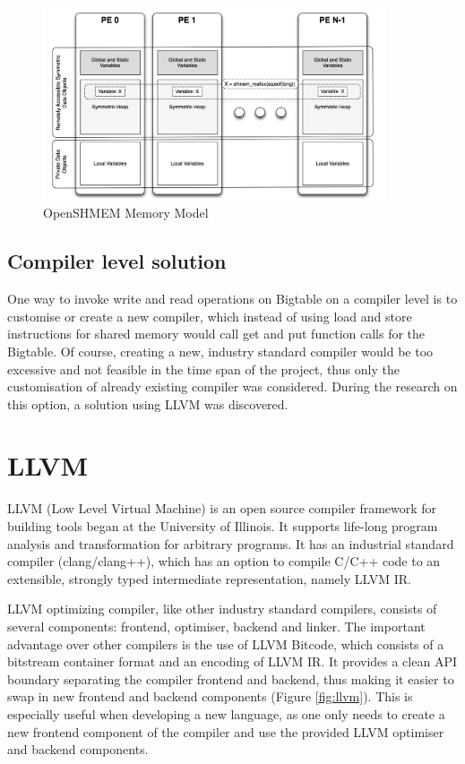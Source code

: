 \documentclass[bsc,frontabs,twoside,singlespacing,parskip,deptreport]{infthesis}     %
\begin{document}
\begin{figure}[H]
\centering
\includegraphics[width=0.9\textwidth]{images/openshmem_memory_model}
\caption{OpenSHMEM Memory Model \cite[source:][]{openshmem_fig}}
\label{fig:openshmem_memory_model}
\end{figure}

\subsection{Compiler level solution}

One way to invoke write and read operations on Bigtable on a compiler level is to customise or create a new compiler, which instead of using load and store instructions for shared memory would call get and put function calls for the Bigtable. Of course, creating a new, industry standard compiler would be too excessive and not feasible in the time span of the project, thus only the customisation of already existing compiler was considered. During the research on this option, a solution using LLVM was discovered. 

\section{LLVM}


LLVM (Low Level Virtual Machine) is an open source compiler framework for building tools began at the University of Illinois. It supports life-long program analysis and transformation for arbitrary programs. It has an industrial standard compiler (clang/clang++), which has an option to compile C/C++ code to an extensible, strongly typed intermediate representation, namely LLVM IR.

LLVM optimizing compiler, like other industry standard compilers, consists of several components: frontend, optimiser, backend and linker. The important advantage over other compilers is the use of LLVM Bitcode, which consists of a bitstream container format and an encoding of LLVM IR. It provides a clean API boundary separating the compiler frontend and backend, thus making it easier to swap in new frontend and backend components (Figure \ref{fig:llvm}). This is especially useful when developing a new language, as one only needs to create a new frontend component of the compiler and use the provided LLVM optimiser and backend components. 
\end{document}
